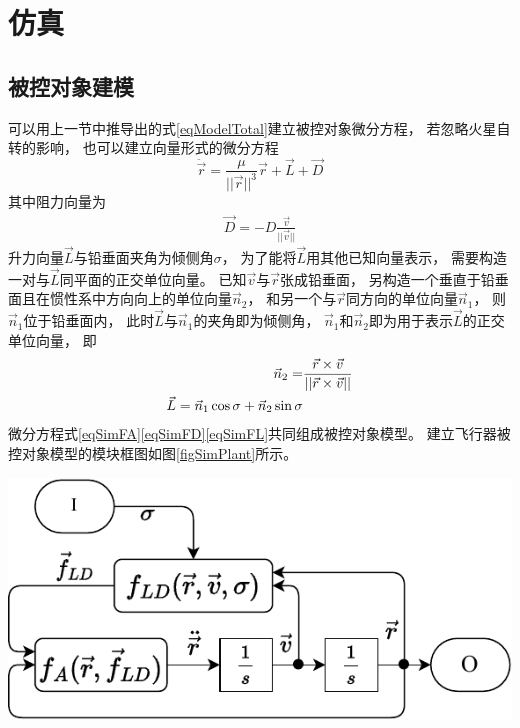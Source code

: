 \section{仿真}

\subsection{被控对象建模}
可以用上一节中推导出的式\eqref{eqModelTotal}建立被控对象微分方程，
若忽略火星自转的影响，
也可以建立向量形式的微分方程
\begin{equation}
    \ddot{\vec{r}} = \frac{\mu}{||\vec{r}||^3}\vec{r}+\vec{L}+\vec{D} \label{eqSimFA}
\end{equation}
其中阻力向量为
\begin{align}
    \vec{D} = -D\frac{\vec{v}}{||\vec{v}||} \label{eqSimFD}
\end{align}
升力向量$\vec{L}$与铅垂面夹角为倾侧角$\sigma$，
为了能将$\vec{L}$用其他已知向量表示，
需要构造一对与$\vec{L}$同平面的正交单位向量。
已知$\vec{v}$与$\vec{r}$张成铅垂面，
另构造一个垂直于铅垂面且在惯性系中方向向上的单位向量$\vec{n}_2$，
和另一个与$\vec{r}$同方向的单位向量$\vec{n}_1$，
则$\vec{n}_1$位于铅垂面内，
此时$\vec{L}$与$\vec{n}_1$的夹角即为倾侧角，
$\vec{n}_1$和$\vec{n}_2$即为用于表示$\vec{L}$的正交单位向量，
即
\begin{align}
    \vec{n}_2 =& \frac{\vec{r}\times\vec{v}}{||\vec{r}\times\vec{v}||} \notag\\
    \vec{L}=\vec{n}_1\cos\sigma + \vec{n}_2\sin\sigma \label{eqSimFL}
\end{align}
微分方程式\eqref{eqSimFA}\eqref{eqSimFD}\eqref{eqSimFL}共同组成被控对象模型。
建立飞行器被控对象模型的模块框图如图\ref{figSimPlant}所示。
\begin{center}
	\includegraphics[scale=0.8]{plant.pdf}  \\
	\label{figSimPlant}
\end{center}
